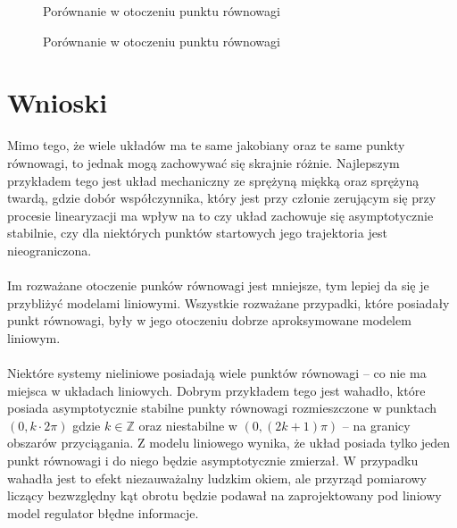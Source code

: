 \documentclass[a4paper, 10pt]{article}
\begin{document}
				\begin{figure}[H]
					\centering
					\def \svgwidth{0.75\columnwidth}
					\caption{Porównanie w otoczeniu punktu równowagi}
				\end{figure}\noindent


				\begin{figure}[H]
					\centering
					\def \svgwidth{0.75\columnwidth}
					
					\caption{Porównanie w otoczeniu punktu równowagi}
				\end{figure}\noindent


	\section{Wnioski}
		Mimo tego, że wiele układów ma te same jakobiany oraz te same punkty równowagi, to jednak mogą zachowywać się skrajnie różnie. Najlepszym przykładem tego jest układ mechaniczny ze sprężyną miękką oraz sprężyną twardą,
		gdzie dobór współczynnika, który jest przy członie zerującym się przy procesie linearyzacji ma wpływ na to czy układ zachowuje się asymptotycznie stabilnie, czy dla niektórych punktów startowych jego trajektoria jest
		nieograniczona.
		\\ \\
		Im rozważane otoczenie punków równowagi jest mniejsze, tym lepiej da się je przybliżyć modelami liniowymi. Wszystkie rozważane przypadki, które posiadały punkt równowagi, były w jego otoczeniu dobrze aproksymowane
		modelem liniowym.
		\\ \\
		Niektóre systemy nieliniowe posiadają wiele punktów równowagi -- co nie ma miejsca w układach liniowych. Dobrym przykładem tego jest wahadło, które posiada asymptotycznie stabilne punkty równowagi rozmieszczone w punktach
		$(0, k \cdot 2\pi)$ gdzie $k \in \mathbb{Z}$ oraz niestabilne w $(0, (2k + 1)\pi)$ -- na granicy obszarów przyciągania. Z modelu liniowego wynika, że układ posiada tylko jeden punkt równowagi i do niego będzie asymptotycznie
		zmierzał. W przypadku wahadła jest to efekt niezauważalny ludzkim okiem, ale przyrząd pomiarowy liczący bezwzględny kąt obrotu będzie podawał na zaprojektowany pod liniowy model regulator błędne informacje.
\end{document}
